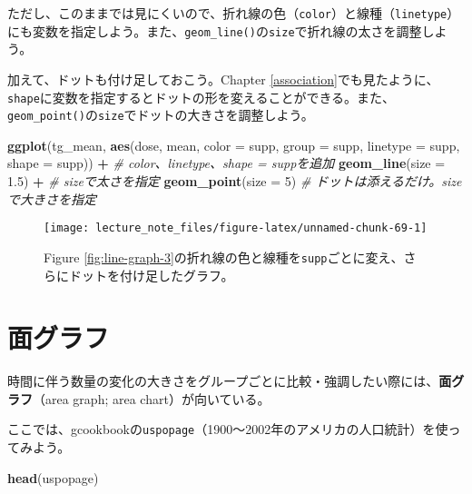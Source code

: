\documentclass[]{book}
\newenvironment{Shaded}{\begin{snugshade}}{\end{snugshade}}
\newcommand{\KeywordTok}[1]{\textcolor[rgb]{0.13,0.29,0.53}{\textbf{#1}}}
\newcommand{\DataTypeTok}[1]{\textcolor[rgb]{0.13,0.29,0.53}{#1}}
\newcommand{\DecValTok}[1]{\textcolor[rgb]{0.00,0.00,0.81}{#1}}
\newcommand{\FloatTok}[1]{\textcolor[rgb]{0.00,0.00,0.81}{#1}}
\newcommand{\StringTok}[1]{\textcolor[rgb]{0.31,0.60,0.02}{#1}}
\newcommand{\CommentTok}[1]{\textcolor[rgb]{0.56,0.35,0.01}{\textit{#1}}}
\newcommand{\OperatorTok}[1]{\textcolor[rgb]{0.81,0.36,0.00}{\textbf{#1}}}
\newcommand{\NormalTok}[1]{#1}
\begin{document}
ただし、このままでは見にくいので、折れ線の色（\texttt{color}）と線種（\texttt{linetype}）にも変数を指定しよう。また、\texttt{geom\_line()}の\texttt{size}で折れ線の太さを調整しよう。

加えて、ドットも付け足しておこう。Chapter
\ref{association}でも見たように、\texttt{shape}に変数を指定するとドットの形を変えることができる。また、\texttt{geom\_point()}の\texttt{size}でドットの大きさを調整しよう。




\begin{Shaded}
\begin{Highlighting}[]
\KeywordTok{ggplot}\NormalTok{(tg_mean, }\KeywordTok{aes}\NormalTok{(dose, mean, }\DataTypeTok{color =}\NormalTok{ supp, }\DataTypeTok{group =}\NormalTok{ supp, }\DataTypeTok{linetype =}\NormalTok{ supp, }\DataTypeTok{shape =}\NormalTok{ supp)) }\OperatorTok{+}\StringTok{ }\CommentTok{# color、linetype、shape = suppを追加}
\StringTok{  }\KeywordTok{geom_line}\NormalTok{(}\DataTypeTok{size =} \FloatTok{1.5}\NormalTok{) }\OperatorTok{+}\StringTok{ }\CommentTok{# sizeで太さを指定}
\StringTok{  }\KeywordTok{geom_point}\NormalTok{(}\DataTypeTok{size =} \DecValTok{5}\NormalTok{) }\CommentTok{# ドットは添えるだけ。sizeで大きさを指定}
\end{Highlighting}
\end{Shaded}

\begin{figure}

{\centering \texttt{[image: lecture\_note\_files/figure-latex/unnamed-chunk-69-1]} 

}

\caption{Figure
\ref{fig:line-graph-3}の折れ線の色と線種を\texttt{supp}ごとに変え、さらにドットを付け足したグラフ。}\label{fig:unnamed-chunk-69}
\end{figure}

\section{面グラフ}

時間に伴う数量の変化の大きさをグループごとに比較・強調したい際には、\textbf{面グラフ}（area
graph; area chart）が向いている。

ここでは、gcookbookの\texttt{uspopage}（1900〜2002年のアメリカの人口統計）を使ってみよう。

\begin{Shaded}
\begin{Highlighting}[]
\KeywordTok{head}\NormalTok{(uspopage)}
\end{Highlighting}
\end{Shaded}
\end{document}
